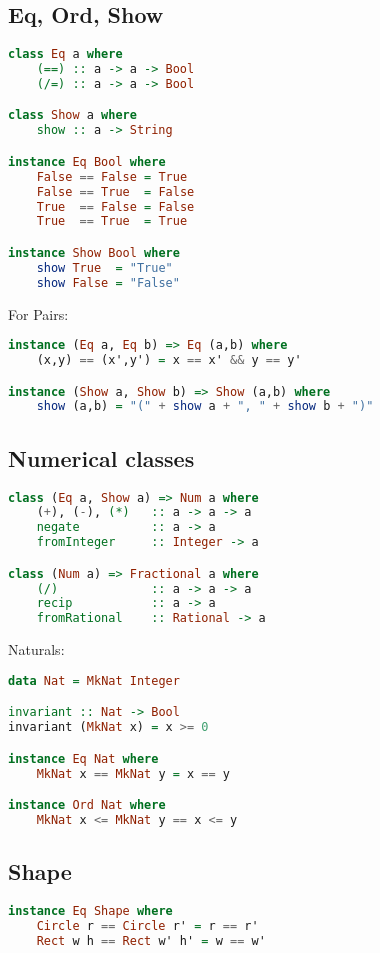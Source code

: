 \documentclass{article}
\begin{document}
\subsection{Eq, Ord, Show}
\begin{lstlisting}[language=haskell]
class Eq a where
    (==) :: a -> a -> Bool
    (/=) :: a -> a -> Bool

class Show a where
    show :: a -> String

instance Eq Bool where
    False == False = True
    False == True  = False
    True  == False = False
    True  == True  = True

instance Show Bool where
    show True  = "True"
    show False = "False"
\end{lstlisting}
For Pairs:
\begin{lstlisting}[language=haskell]
instance (Eq a, Eq b) => Eq (a,b) where
    (x,y) == (x',y') = x == x' && y == y'

instance (Show a, Show b) => Show (a,b) where
    show (a,b) = "(" + show a + ", " + show b + ")"
\end{lstlisting}
\subsection{Numerical classes}
\begin{lstlisting}[language=haskell]
class (Eq a, Show a) => Num a where
    (+), (-), (*)   :: a -> a -> a
    negate          :: a -> a
    fromInteger     :: Integer -> a

class (Num a) => Fractional a where
    (/)             :: a -> a -> a
    recip           :: a -> a
    fromRational    :: Rational -> a
\end{lstlisting}
Naturals:
\begin{lstlisting}[language=haskell]
data Nat = MkNat Integer

invariant :: Nat -> Bool
invariant (MkNat x) = x >= 0

instance Eq Nat where
    MkNat x == MkNat y = x == y

instance Ord Nat where
    MkNat x <= MkNat y == x <= y
\end{lstlisting}
\subsection{Shape}
\begin{lstlisting}[language=haskell]
instance Eq Shape where
    Circle r == Circle r' = r == r'
    Rect w h == Rect w' h' = w == w'
\end{lstlisting}
\end{document}
